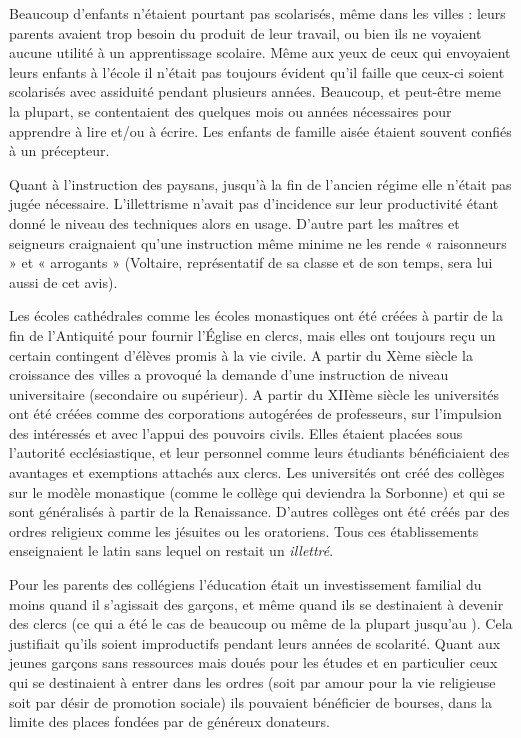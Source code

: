  Beaucoup d'enfants n'étaient pourtant pas scolarisés, même dans les villes : leurs parents avaient trop besoin du produit de leur travail, ou bien ils ne voyaient aucune utilité à un apprentissage scolaire. Même aux yeux de ceux qui envoyaient leurs enfants à l'école il n'était pas toujours évident qu'il faille que ceux-ci soient scolarisés avec assiduité pendant plusieurs années. Beaucoup, et peut-être meme la plupart, se contentaient des quelques mois ou années nécessaires pour apprendre à lire et/ou à écrire. Les enfants de famille aisée étaient souvent confiés à un précepteur.  

 Quant à l'instruction des paysans, jusqu'à la fin de l'ancien régime elle n'était pas jugée nécessaire. L'illettrisme n'avait pas d'incidence sur leur productivité étant donné le niveau des techniques alors en usage. D'autre part les maîtres et seigneurs craignaient qu'une instruction même minime ne les rende « raisonneurs » et « arrogants » (Voltaire, représentatif de sa classe et de son temps, sera lui aussi de cet avis).

 Les écoles cathédrales comme les écoles monastiques ont été créées à partir de la fin de l'Antiquité pour fournir l'Église en clercs, mais elles ont toujours reçu un certain contingent d'élèves promis à la vie civile. A partir du Xème siècle la croissance des villes a provoqué la demande d'une instruction de niveau universitaire (secondaire ou supérieur). A partir du XIIème siècle les universités ont été créées comme des corporations autogérées de professeurs, sur l'impulsion des intéressés et avec l'appui des pouvoirs civils. Elles étaient placées sous l'autorité ecclésiastique, et leur personnel comme leurs étudiants bénéficiaient des avantages et exemptions attachés aux clercs. Les universités ont créé des collèges sur le modèle monastique (comme le collège qui deviendra la Sorbonne) et qui se sont généralisés à partir de la Renaissance. D'autres collèges ont été créés par des ordres religieux comme les jésuites ou les oratoriens. Tous ces établissements enseignaient le latin sans lequel on restait un \emph{illettré}. 
 
 Pour les parents des collégiens l'éducation était un investissement familial du moins quand il s'agissait des garçons, et même quand ils se destinaient à devenir des clercs (ce qui a été le cas de beaucoup ou même de la plupart jusqu'au ). Cela justifiait qu'ils soient improductifs pendant leurs années de scolarité. Quant aux jeunes garçons sans ressources mais doués pour les études et en particulier ceux qui se destinaient à entrer dans les ordres (soit par amour pour la vie religieuse soit par désir de promotion sociale) ils pouvaient bénéficier de bourses, dans la limite des places fondées par de généreux donateurs.
 
